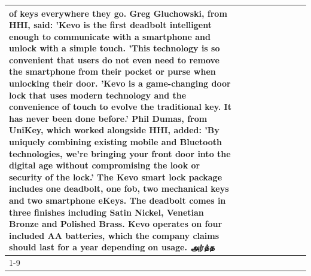 \begin{table}[H]
\begin{tabular}{lllrlllll}
of keys everywhere they go. Greg Gluchowski, from HHI, said: 'Kevo is the first deadbolt intelligent enough to communicate with a smartphone and unlock with a simple touch. 'This technology is so convenient that users do not even need to remove the smartphone from their pocket or purse when unlocking their door. 'Kevo is a game-changing door lock that uses modern technology and the convenience of touch to evolve the traditional key. It has never been done before.' Phil Dumas, from UniKey, which worked alongside HHI, added: 'By uniquely combining existing mobile and Bluetooth technologies, we’re bringing your front door into the digital age without compromising the look or security of the lock.' The Kevo smart lock package includes one deadbolt, one fob, two mechanical keys and two smartphone eKeys. The deadbolt comes in three finishes including Satin Nickel, Venetian Bronze and Polished Brass. Kevo operates on four included AA batteries, which the company claims should last for a year depending on usage. அர்த்த \\
\cline{1-9}

\end{tabular}
\end{table}
